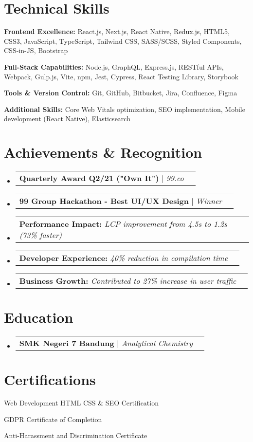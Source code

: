 \documentclass[a4paper, 11pt]{article}
\makeatletter
\newcommand{\resumeProjectHeading}[2]{
    \item
    \begin{tabular*}{0.987\textwidth}{l@{\extracolsep{\fill}}r}
      \small#1\\
    \end{tabular*}\vspace{-7pt}
}
\newcommand{\resumeSubHeadingListStart}{\begin{itemize}[leftmargin=0.1in, label={}]}
\newcommand{\resumeSubHeadingListEnd}{\end{itemize}\vspace{5pt}}
\makeatother
\begin{document}
\section{Technical Skills}
    \resumeSubHeadingListStart
        \small{
            \item \textbf{Frontend Excellence:} React.js, Next.js, React Native, Redux.js, HTML5, CSS3, JavaScript, TypeScript, Tailwind CSS, SASS/SCSS, Styled Components, CSS-in-JS, Bootstrap
            \item \textbf{Full-Stack Capabilities:} Node.js, GraphQL, Express.js, RESTful APIs, Webpack, Gulp.js, Vite, npm, Jest, Cypress, React Testing Library, Storybook
            \item \textbf{Tools \& Version Control:} Git, GitHub, Bitbucket, Jira, Confluence, Figma
            \item \textbf{Additional Skills:} Core Web Vitals optimization, SEO implementation, Mobile development (React Native), Elasticsearch
        }
    \resumeSubHeadingListEnd

\section{Achievements \& Recognition}
    \resumeSubHeadingListStart
        \resumeProjectHeading
            {\textbf{Quarterly Award Q2/21 ("Own It")} $|$ \emph{99.co}}{2021}
        \resumeProjectHeading
            {\textbf{99 Group Hackathon - Best UI/UX Design} $|$ \emph{Winner}}{2021}
        \resumeProjectHeading
            {\textbf{Performance Impact:} \emph{LCP improvement from 4.5s to 1.2s (73\% faster)}}{}
        \resumeProjectHeading
            {\textbf{Developer Experience:} \emph{40\% reduction in compilation time}}{}
        \resumeProjectHeading
            {\textbf{Business Growth:} \emph{Contributed to 27\% increase in user traffic}}{}
    \resumeSubHeadingListEnd

\section{Education}
    \resumeSubHeadingListStart
        \resumeProjectHeading
            {\textbf{SMK Negeri 7 Bandung} $|$ \emph{Analytical Chemistry}}{2009 -- 2011}
    \resumeSubHeadingListEnd

\section{Certifications}
    \resumeSubHeadingListStart
        \small{
            \item Web Development HTML CSS \& SEO Certification
            \item GDPR Certificate of Completion
            \item Anti-Harassment and Discrimination Certificate
        }
    \resumeSubHeadingListEnd
\end{document}
